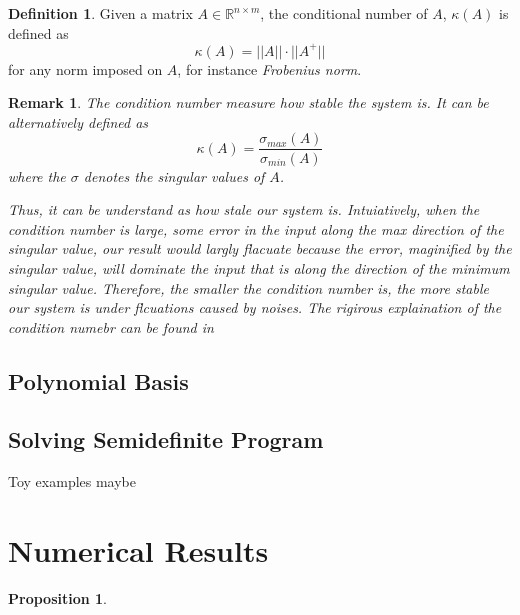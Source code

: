 \documentclass[12pt]{amsart}
\numberwithin{equation}{section}
\newtheorem{prop}[thm]{Proposition}
\newtheorem{remark}[thm]{Remark}
\theoremstyle{definition}
\newtheorem{definition}[thm]{Definition}
\numberwithin{thm}{section}
\begin{document}
\begin{definition}
     Given a matrix $A \in \mathbb{R}^{n \times m}$, the conditional number of $A$, $\kappa(A)$ is defined as
     \begin{equation}
          \kappa(A) = ||A|| \cdot ||A^+||
     \end{equation}
     for any norm imposed on $A$, for instance \emph{Frobenius norm}.
\end{definition}

\begin{remark}
     The condition number measure how stable the system is. It can be alternatively defined as
     \begin{equation}
          \kappa(A) = \frac{\sigma_{max} (A)}{\sigma_{min} (A)}
     \end{equation}
     where the $\sigma$ denotes the singular values of $A$.

     Thus, it can be understand as how stale our system is. 
     Intuiatively, when the condition number is large, some error in the input along the max direction of the singular value,
     our result would largly flacuate because the error, maginified by the singular value, will dominate the input that is along
     the direction of the minimum singular value. 
     Therefore, the smaller the condition number is, the more stable our system is under flcuations caused by noises.
     The rigirous explaination of the condition numebr can be found in \cite{Cheney:Kincaid}
\end{remark}

\subsection{Polynomial Basis}
\label{Sec:polynomial Basis}

\subsection{Solving Semidefinite Program}
\label{Sec:Solving Semidefinite Program}




Toy examples maybe

\section{Numerical Results}


\begin{prop}

\end{prop}
\end{document}
